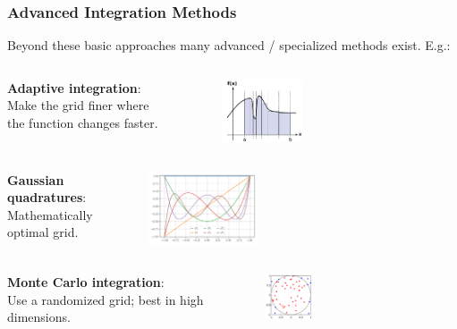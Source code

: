 \documentclass[11pt,aspectratio=169]{beamer}
\begin{document}
\begin{frame}
\frametitle{Advanced Integration Methods}
Beyond these basic approaches many advanced / specialized methods exist. E.g.:
\pause
\begin{columns}
	\textbf{Adaptive integration}: \\
	Make the grid finer where the function changes faster.
	\begin{figure}
		\centering
		\includegraphics[width=0.4\textwidth]{fig/integration-adaptive}
	\end{figure}%
\end{columns}

\pause
\begin{columns}
	\textbf{Gaussian quadratures}: \\
	Mathematically optimal grid.
	\begin{figure}
		\centering
		\includegraphics[width=0.4\textwidth]{fig/integration-legendre}
	\end{figure}%
\end{columns}

\pause
\begin{columns}
	\textbf{Monte Carlo integration}: \\
	Use a randomized grid; best in high dimensions.
	\begin{figure}
		\centering
		\includegraphics[width=0.3\textwidth]{fig/integration-monte-carlo}
	\end{figure}%
\end{columns}

\end{frame}
\end{document}
